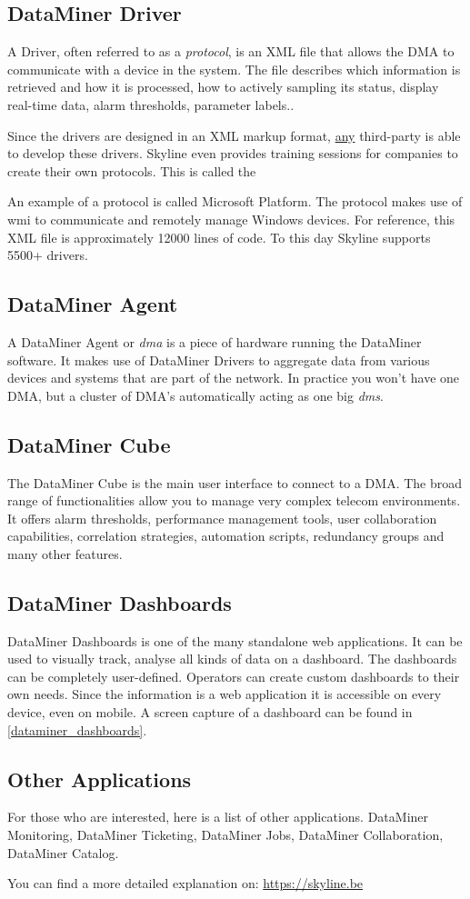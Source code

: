 \subsection{DataMiner Driver}
A Driver, often referred to as a \textit{protocol}, is an XML file that allows the DMA to communicate with a device in the system. The file describes which information is retrieved and how it is processed, how to actively sampling its status, display real-time data, alarm thresholds, parameter labels..

Since the drivers are designed in an XML markup format, \underline{any} third-party is able to develop these drivers. Skyline even provides training sessions for companies to create their own protocols. This is called the  

An example of a protocol is called Microsoft Platform. The protocol makes use of \gls{wmi} to communicate and remotely manage Windows devices. For reference, this XML file is approximately 12000 lines of code. To this day Skyline supports 5500+ drivers. 


\subsection{DataMiner Agent}

A DataMiner Agent or \textit{\gls{dma}} is a piece of hardware running the DataMiner software. It makes use of DataMiner Drivers to aggregate data from various devices and systems that are part of the network. In practice you won't have one DMA, but a cluster of DMA's automatically acting as one big \textit{\gls{dms}}.  

\subsection{DataMiner Cube}
The DataMiner Cube is the main user interface to connect to a DMA. The broad range of functionalities allow you to manage very complex telecom environments. It offers alarm thresholds, performance management tools, user collaboration capabilities, correlation strategies,  automation scripts, redundancy groups and many other features. 

\subsection{DataMiner Dashboards}
 DataMiner Dashboards is one of the many standalone web applications. It can be used to visually track, analyse all kinds of data on a dashboard. The dashboards can be completely user-defined. Operators can create custom dashboards to their own needs. Since the information is a web application it is accessible on every device, even on mobile. A screen capture of a dashboard can be found in \autoref{dataminer_dashboards}.
 
 
\subsection{Other Applications}
For those who are interested, here is a list of other applications. DataMiner Monitoring, DataMiner Ticketing, DataMiner Jobs, DataMiner Collaboration, DataMiner Catalog. 

You can find a more detailed explanation on: \url{https://skyline.be}

